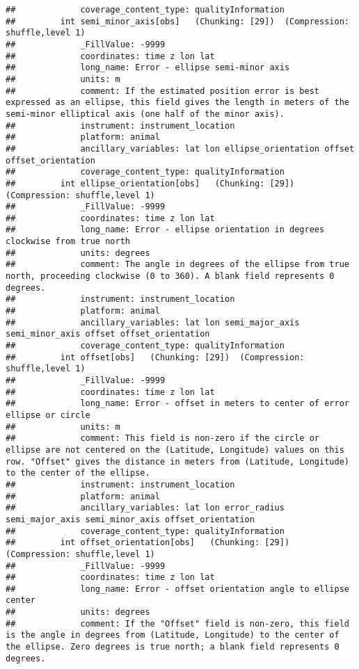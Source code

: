 \documentclass[
]{book}
\begin{document}
\begin{verbatim}
##             coverage_content_type: qualityInformation
##         int semi_minor_axis[obs]   (Chunking: [29])  (Compression: shuffle,level 1)
##             _FillValue: -9999
##             coordinates: time z lon lat
##             long_name: Error - ellipse semi-minor axis
##             units: m
##             comment: If the estimated position error is best expressed as an ellipse, this field gives the length in meters of the semi-minor elliptical axis (one half of the minor axis).
##             instrument: instrument_location
##             platform: animal
##             ancillary_variables: lat lon ellipse_orientation offset offset_orientation
##             coverage_content_type: qualityInformation
##         int ellipse_orientation[obs]   (Chunking: [29])  (Compression: shuffle,level 1)
##             _FillValue: -9999
##             coordinates: time z lon lat
##             long_name: Error - ellipse orientation in degrees clockwise from true north
##             units: degrees
##             comment: The angle in degrees of the ellipse from true north, proceeding clockwise (0 to 360). A blank field represents 0 degrees.
##             instrument: instrument_location
##             platform: animal
##             ancillary_variables: lat lon semi_major_axis semi_minor_axis offset offset_orientation
##             coverage_content_type: qualityInformation
##         int offset[obs]   (Chunking: [29])  (Compression: shuffle,level 1)
##             _FillValue: -9999
##             coordinates: time z lon lat
##             long_name: Error - offset in meters to center of error ellipse or circle
##             units: m
##             comment: This field is non-zero if the circle or ellipse are not centered on the (Latitude, Longitude) values on this row. "Offset" gives the distance in meters from (Latitude, Longitude) to the center of the ellipse.
##             instrument: instrument_location
##             platform: animal
##             ancillary_variables: lat lon error_radius semi_major_axis semi_minor_axis offset_orientation
##             coverage_content_type: qualityInformation
##         int offset_orientation[obs]   (Chunking: [29])  (Compression: shuffle,level 1)
##             _FillValue: -9999
##             coordinates: time z lon lat
##             long_name: Error - offset orientation angle to ellipse center
##             units: degrees
##             comment: If the "Offset" field is non-zero, this field is the angle in degrees from (Latitude, Longitude) to the center of the ellipse. Zero degrees is true north; a blank field represents 0 degrees.

\end{verbatim}
\end{document}
